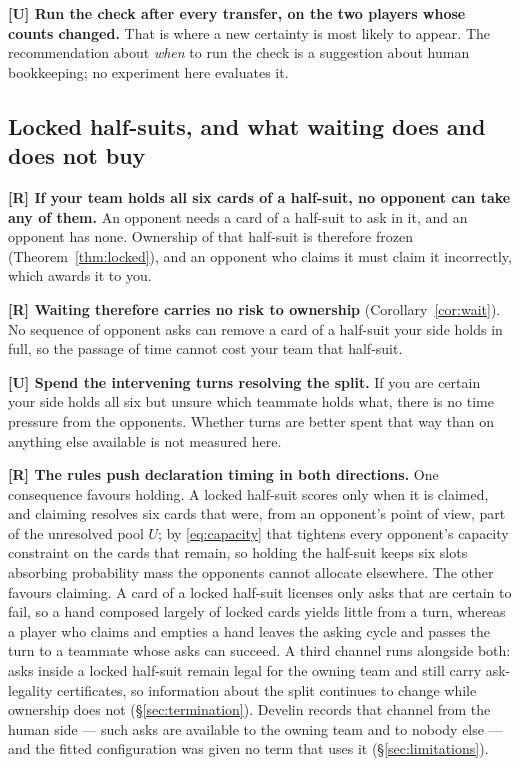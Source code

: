 \textbf{[U] Run the check after every transfer, on the two players whose
counts changed.} That is where a new certainty is most likely to appear. The
recommendation about \emph{when} to run the check is a suggestion about human
bookkeeping; no experiment here evaluates it.

\subsection{Locked half-suits, and what waiting does and does not buy}
\label{app:human-locked}

\textbf{[R] If your team holds all six cards of a half-suit, no opponent can
take any of them.} An opponent needs a card of a half-suit to ask in it, and an
opponent has none. Ownership of that half-suit is therefore frozen
(Theorem~\ref{thm:locked}), and an opponent who claims it must claim it
incorrectly, which awards it to you.

\textbf{[R] Waiting therefore carries no risk to ownership}
(Corollary~\ref{cor:wait}). No sequence of opponent asks can remove a card of a
half-suit your side holds in full, so the passage of time cannot cost your team
that half-suit.

\textbf{[U] Spend the intervening turns resolving the split.} If you are
certain your side holds all six but unsure which teammate holds what, there is
no time pressure from the opponents. Whether turns are better spent that way
than on anything else available is not measured here.

\textbf{[R] The rules push declaration timing in both directions.} One
consequence favours holding. A locked half-suit scores only when it is claimed,
and claiming resolves six cards that were, from an opponent's point of view,
part of the unresolved pool $U$; by \eqref{eq:capacity} that tightens every
opponent's capacity constraint on the cards that remain, so holding the
half-suit keeps six slots absorbing probability mass the opponents cannot
allocate elsewhere. The other favours claiming. A card of a locked half-suit
licenses only asks that are certain to fail, so a hand composed largely of
locked cards yields little from a turn, whereas a player who claims and empties
a hand leaves the asking cycle and passes the turn to a teammate whose asks can
succeed. A third channel runs alongside both: asks inside a
locked half-suit remain legal for the owning team and still carry ask-legality
certificates, so information about the split continues to change while ownership
does not (\S\ref{sec:termination}). Develin \cite{develin} records that
channel from the human side --- such asks are available to the owning team and
to nobody else --- and the fitted \vfast{} configuration was given no term that
uses it (\S\ref{sec:limitations}).

